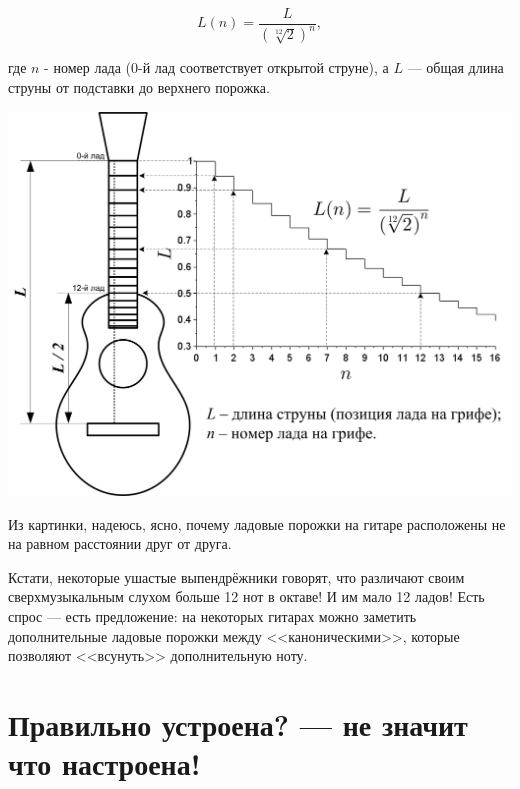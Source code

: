 \begin{equation}
    \label{fig:guitar:construction:length}
    L(n)=\frac{L}{(\sqrt[12]{2})^n},
\end{equation}

где $n$ - номер лада ($0$-й лад соответствует открытой струне), а $L$ --- общая длина струны от подставки до верхнего порожка.


\includegraphics{fig/string-length.png}


Из картинки, надеюсь, ясно, почему ладовые порожки на гитаре расположены не на равном расстоянии друг от друга.

Кстати, некоторые ушастые выпендрёжники говорят, что различают своим сверхмузыкальным слухом больше 12 нот в октаве! И им мало 12 ладов! Есть спрос --- есть предложение: на некоторых гитарах можно заметить дополнительные ладовые порожки между <<каноническими>>, которые позволяют <<всунуть>> дополнительную ноту.


\section{Правильно устроена? --- не значит что настроена!}
\label{ch:guitar:tuning}

